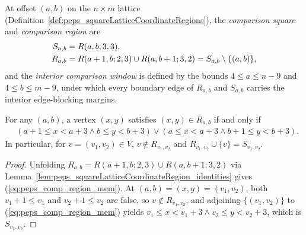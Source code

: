 \begin{definition}%
    \label{def:peps_normalSquareComparisonRegions}
    \leanok
    At offset $(a,b)$ on the $n\times m$ lattice
    (Definition~\ref{def:peps_squareLatticeCoordinateRegions}), the
    \emph{comparison square} and \emph{comparison region} are
    \begin{align}
        S_{a,b} & = R(a,b;3,3), \notag                                       \\
        R_{a,b} & = R(a+1,b;2,3)\cup R(a,b+1;3,2)=S_{a,b}\setminus\{(a,b)\},
        \notag
    \end{align}
    and the \emph{interior comparison window} is defined by the bounds
    $4\le a\le n-9$ and $4\le b\le m-9$, under which every boundary edge of
    $R_{a,b}$ and $S_{a,b}$ carries the interior edge-blocking margins.
\end{definition}

\begin{lemma}%
    \label{lem:peps_normalSquareComparisonRegion_membership}
    \leanok
    For any $(a,b)$, a vertex $(x,y)$ satisfies $(x,y)\in R_{a,b}$ if and only
    if
    \begin{align}
         & (a+1\le x<a+3\wedge b\le y<b+3)
        \lor
        (a\le x<a+3\wedge b+1\le y<b+3).
        \label{eq:peps_comp_region_mem}
    \end{align}
    In particular, for $v=(v_1,v_2)\in V$, $v\notin R_{v_1,v_2}$ and
    $R_{v_1,v_2}\cup\{v\}=S_{v_1,v_2}$.
\end{lemma}
\begin{proof}\leanok
    Unfolding $R_{a,b}=R(a+1,b;2,3)\cup R(a,b+1;3,2)$ via
    Lemma~\ref{lem:peps_squareLatticeCoordinateRegion_identities} gives
    (\ref{eq:peps_comp_region_mem}). At $(a,b)=(x,y)=(v_1,v_2)$, both
    $v_1+1\le v_1$ and $v_2+1\le v_2$ are false, so $v\notin R_{v_1,v_2}$, and
    adjoining $\{(v_1,v_2)\}$ to (\ref{eq:peps_comp_region_mem}) yields
    $v_1\le x<v_1+3\wedge v_2\le y<v_2+3$, which is $S_{v_1,v_2}$.
\end{proof}

